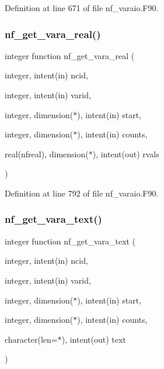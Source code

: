 Definition at line 671 of file nf\+\_\+varaio.\+F90.

\mbox{\label{nf__varaio_8F90_ad0cf70280990b3ae93c2ee54d2012dd3}} 
\subsubsection{\texorpdfstring{nf\+\_\+get\+\_\+vara\+\_\+real()}{nf\_get\_vara\_real()}}
{\footnotesize\ttfamily integer function nf\+\_\+get\+\_\+vara\+\_\+real (\begin{DoxyParamCaption}\item[{integer, intent(in)}]{ncid,  }\item[{integer, intent(in)}]{varid,  }\item[{integer, dimension($\ast$), intent(in)}]{start,  }\item[{integer, dimension($\ast$), intent(in)}]{counts,  }\item[{real(nfreal), dimension($\ast$), intent(out)}]{rvals }\end{DoxyParamCaption})}



Definition at line 792 of file nf\+\_\+varaio.\+F90.

\mbox{\label{nf__varaio_8F90_ace29ec4368a5f1bf032b1b0516d28b04}} 
\subsubsection{\texorpdfstring{nf\+\_\+get\+\_\+vara\+\_\+text()}{nf\_get\_vara\_text()}}
{\footnotesize\ttfamily integer function nf\+\_\+get\+\_\+vara\+\_\+text (\begin{DoxyParamCaption}\item[{integer, intent(in)}]{ncid,  }\item[{integer, intent(in)}]{varid,  }\item[{integer, dimension($\ast$), intent(in)}]{start,  }\item[{integer, dimension($\ast$), intent(in)}]{counts,  }\item[{character(len=$\ast$), intent(out)}]{text }\end{DoxyParamCaption})}



